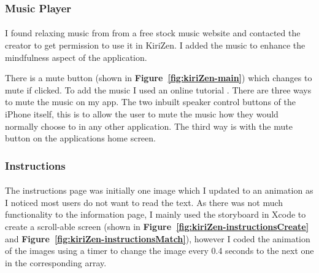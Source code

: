 \documentclass[11pt]{article}
\begin{document}
             \subsubsection{Music Player}
                         \paragraph{}

                I found relaxing music from from a free stock music website \cite{Lofi}  
                and contacted the creator to get permission to use it in KiriZen. I added the music to enhance the mindfulness aspect of the application.
                
                There is a mute button (shown in \textbf{Figure~\ref{fig:kiriZen-main}}) which changes to mute if clicked. To add the music I used an online tutorial \cite{MusicPlayer}.
                There are three ways to mute the music on my app. The two inbuilt speaker control buttons of the iPhone itself, this is to allow the user to mute the music how they would normally choose to in any other application. The third way is with the mute button on the applications home screen.
                
        \subsubsection{Instructions}
            
                \paragraph{}
                    The instructions page was initially one image which I updated to an animation as I noticed most users do not want to read the text.
                    As there was not much functionality to the information page, I mainly used the storyboard in Xcode to create a scroll-able screen (shown in \textbf{Figure~\ref{fig:kiriZen-instructionsCreate}} and \textbf{Figure~\ref{fig:kiriZen-instructionsMatch}}), however I coded the animation of the images using a timer to change the image every 0.4 seconds to the next one in the corresponding array. 
           
\end{document}
